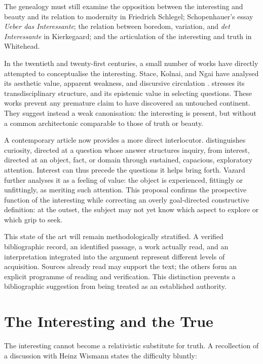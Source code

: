\documentclass[11pt,a4paper]{article}
\begin{document}
The genealogy must still examine the opposition between the interesting and
beauty and its relation to modernity in Friedrich Schlegel; Schopenhauer's essay
\emph{Ueber das Interessante}; the relation between boredom, variation, and
\emph{det Interessante} in Kierkegaard; and the articulation of the interesting
and truth in Whitehead.

In the twentieth and twenty-first centuries, a small number of works have
directly attempted to conceptualise the interesting. Stace, Kolnai, and Ngai
have analysed its aesthetic value, apparent weakness, and discursive circulation
\parencite{stace1944interestingness,kolnai1964concept,ngai2008merely,ngai2012categories}.
\textcite{epstein2009interesting} stresses its transdisciplinary structure, and
\textcite{grimm2011interesting} its epistemic value in selecting questions.
These works prevent any premature claim to have discovered an untouched
continent. They suggest instead a weak canonisation: the interesting is present,
but without a common architectonic comparable to those of truth or beauty.

A contemporary article now provides a more direct interlocutor.
\textcite{vazard2026inquiry} distinguishes curiosity, directed at a question
whose answer structures inquiry, from interest, directed at an object, fact, or
domain through sustained, capacious, exploratory attention. Interest can thus
precede the questions it helps bring forth. Vazard further analyses it as a
feeling of value: the object is experienced, fittingly or unfittingly, as
meriting such attention. This proposal confirms the prospective function of the
interesting while correcting an overly goal-directed constructive definition:
at the outset, the subject may not yet know which aspect to explore or which
grip to seek.

This state of the art will remain methodologically stratified. A verified
bibliographic record, an identified passage, a work actually read, and an
interpretation integrated into the argument represent different levels of
acquisition. Sources already read may support the text; the others form an
explicit programme of reading and verification. This distinction prevents a
bibliographic suggestion from being treated as an established authority.

\section{The Interesting and the True}

The interesting cannot become a relativistic substitute for truth. A
recollection of a discussion with Heinz Wismann states the difficulty bluntly:
\end{document}
